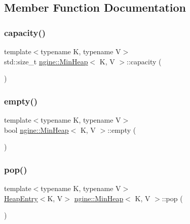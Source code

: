\subsection{Member Function Documentation}
\mbox{\label{classngine_1_1MinHeap_af42bfc0b83ceca5c2486865d79a79871}} 
\subsubsection{\texorpdfstring{capacity()}{capacity()}}
{\footnotesize\ttfamily template$<$typename K, typename V$>$ \\
std\+::size\+\_\+t \hyperlink{classngine_1_1MinHeap}{ngine\+::\+Min\+Heap}$<$ K, V $>$\+::capacity (\begin{DoxyParamCaption}{ }\end{DoxyParamCaption})\hspace{0.3cm}{\ttfamily [inline]}}

\mbox{\label{classngine_1_1MinHeap_a7850bf0a2331613376935f2da1cde217}} 
\subsubsection{\texorpdfstring{empty()}{empty()}}
{\footnotesize\ttfamily template$<$typename K, typename V$>$ \\
bool \hyperlink{classngine_1_1MinHeap}{ngine\+::\+Min\+Heap}$<$ K, V $>$\+::empty (\begin{DoxyParamCaption}{ }\end{DoxyParamCaption})\hspace{0.3cm}{\ttfamily [inline]}}

\mbox{\label{classngine_1_1MinHeap_a21a3fe9a338552baecf2cff96d22bcf0}} 
\subsubsection{\texorpdfstring{pop()}{pop()}}
{\footnotesize\ttfamily template$<$typename K, typename V$>$ \\
\hyperlink{structngine_1_1HeapEntry}{Heap\+Entry}$<$K, V$>$ \hyperlink{classngine_1_1MinHeap}{ngine\+::\+Min\+Heap}$<$ K, V $>$\+::pop (\begin{DoxyParamCaption}{ }\end{DoxyParamCaption})\hspace{0.3cm}{\ttfamily [inline]}}

